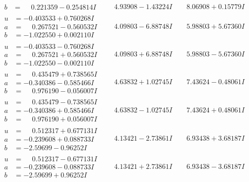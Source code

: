 \documentclass[1p]{elsarticle_modified}
\theoremstyle{definition}
\begin{document}
$$\begin{array}{c|c|c}
\begin{aligned}
b &= \phantom{-}0.221359 - 0.254814 I\end{aligned}
 & \phantom{-}4.93908 - 1.43224 I & \phantom{-}8.06908 + 0.15779 I \\ \hline\begin{aligned}
u &= -0.403533 + 0.760268 I \\
a &= \phantom{-}0.267521 - 0.560532 I \\
b &= -1.022550 + 0.002110 I\end{aligned}
 & \phantom{-}4.09803 - 6.88748 I & \phantom{-}5.98803 + 5.67360 I \\ \hline\begin{aligned}
u &= -0.403533 - 0.760268 I \\
a &= \phantom{-}0.267521 + 0.560532 I \\
b &= -1.022550 - 0.002110 I\end{aligned}
 & \phantom{-}4.09803 + 6.88748 I & \phantom{-}5.98803 - 5.67360 I \\ \hline\begin{aligned}
u &= \phantom{-}0.435479 + 0.738565 I \\
a &= -0.340386 - 0.585466 I \\
b &= \phantom{-}0.976190 - 0.056007 I\end{aligned}
 & \phantom{-}4.63832 + 1.02745 I & \phantom{-}7.43624 - 0.48061 I \\ \hline\begin{aligned}
u &= \phantom{-}0.435479 - 0.738565 I \\
a &= -0.340386 + 0.585466 I \\
b &= \phantom{-}0.976190 + 0.056007 I\end{aligned}
 & \phantom{-}4.63832 - 1.02745 I & \phantom{-}7.43624 + 0.48061 I \\ \hline\begin{aligned}
u &= \phantom{-}0.512317 + 0.677131 I \\
a &= -0.239608 + 0.088733 I \\
b &= -2.59699 - 0.96252 I\end{aligned}
 & \phantom{-}4.13421 - 2.73861 I & \phantom{-}6.93438 + 3.68187 I \\ \hline\begin{aligned}
u &= \phantom{-}0.512317 - 0.677131 I \\
a &= -0.239608 - 0.088733 I \\
b &= -2.59699 + 0.96252 I\end{aligned}
 & \phantom{-}4.13421 + 2.73861 I & \phantom{-}6.93438 - 3.68187 I \\ \hline\begin{aligned}

\end{aligned}
\end{array}$$
\end{document}
